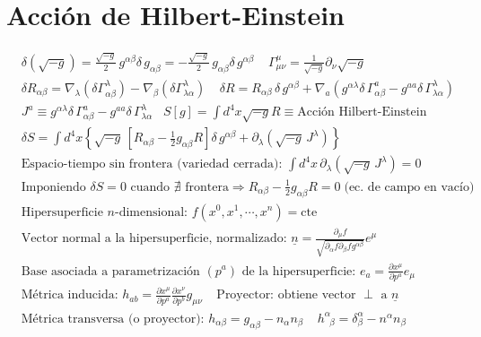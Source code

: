 \section*{Acción de Hilbert-Einstein }
\begin{align*}
    &\delta(\sqrt{-g})=\frac{\sqrt{-g}}{2}\,g^{\alpha \beta}\delta \, g_{\alpha \beta} = - \frac{\sqrt{-g}}{2}\,g_{\alpha \beta}\delta \, g^{\alpha \beta}\; \; \; \; \Gamma_{\mu\nu}^\mu=\frac{1}{\sqrt{-g}}\partial_\nu \sqrt{-g}\\
    &\delta R_{\alpha\beta}= \nabla_\lambda(\delta \Gamma^\lambda_{\alpha\beta})- \nabla_\beta(\delta \Gamma^\lambda_{\lambda \alpha}) \; \; \; \; \delta R= R_{\alpha \beta} \,\delta\, g^{\alpha \beta}+ \nabla_a( g^{\alpha \lambda}\delta\,\Gamma^a_{\alpha\beta}- g^{aa}\delta\,\Gamma^\lambda_{\lambda\alpha})\\
    &J^a \equiv g^{\alpha \lambda}\delta\,\Gamma^a_{\alpha\beta}-g^{aa}\delta\,\Gamma^\lambda_{\lambda\alpha}\;  \;\; S [g] = \int d^4 x \sqrt{-g} R\equiv \text{Acción Hilbert-Einstein}
    \\& \delta S=\int d^4x\left\{\sqrt{-g}\, \left[R_{\alpha \beta} -\frac{1}{2} g_{\alpha \beta}R\right]\delta \, g^{\alpha\beta}\!+\partial_\lambda(\sqrt{-g}\,J^\lambda)\right\}\\
    &\text{Espacio-tiempo sin frontera (variedad cerrada): } \int d^4x \,\partial_\lambda(\sqrt{-g}\, J^\lambda)=0\\
    &\text{Imponiendo $\delta S=0$ cuando $\nexists$  frontera}\Rightarrow R_{\alpha\beta}\!-\!\frac{1}{2}g_{\alpha \beta}R\!=\!0\;  \text{(ec. de campo en vacío)}\\
    &\text{Hipersuperficie $n$-dimensional: } f(x^0, x^1, \cdots, x^n) = \text{cte}\\
    &\text{Vector normal a la hipersuperficie, normalizado: }\underline{n}= \frac{\partial_\mu f}{\sqrt{\partial_\alpha f\partial_\beta f g^{\alpha\beta}}}e^\mu\\
    &\text{Base asociada a parametrización $(p^a)$ de la hipersuperficie: }e_a= \frac{\partial x^\mu}{\partial p^a}e_\mu\\
    &\text{Métrica inducida: } h_{ab}=\frac{\partial x^\mu}{\partial p^a}\frac{\partial x^\nu}{\partial p^b}g_{\mu \nu}\;\;\;\;  \text{Proyector: obtiene vector $\perp$ a $\underline{n}$}\\
    &\text{Métrica transversa (o proyector): } h_{\alpha \beta}= g_{\alpha \beta}- n_\alpha n_\beta\; \; \; \; h^\alpha_{\; \; \beta}=   \delta^\alpha_{\beta}- n^\alpha n_\beta\\

\end{align*}

